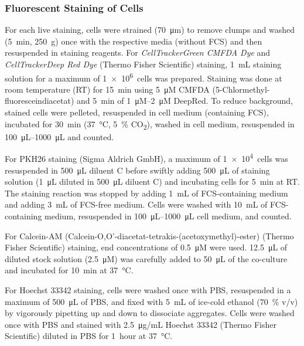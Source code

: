 \subsubsection*{Fluorescent Staining of Cells}
For each live staining, cells were strained (\SI{70}{\micro\meter}) to remove
clumps and washed (\SI{5}{\minute}, \SI{250}{g}) once with the respective media
(without FCS) and then resuspended in staining reagents. For
\textit{CellTracker\texttrademark Green CMFDA Dye} and
\textit{CellTracker\texttrademark Deep Red Dye} (Thermo Fisher Scientific)
staining, \SI{1}{mL} staining solution for a maximum of \SI{1e6}{cells} was
prepared. Staining was done at room temperature (RT) for \SI{15}{\minute} using
\SI{5}{\micro M} CMFDA (5-Chlormethyl-fluoresceindiacetat) and \SI{5}{\minute}
of \SIrange{1}{2}{\micro M} DeepRed. To reduce background, stained cells were
pelleted, resuspended in cell medium (containing FCS), incubated for
\SI{30}{\minute} (\SI{37}{\degreeCelsius}, \SI{5}{\percent}
CO\textsubscript{2}), washed in cell medium, resuspended in
\SIrange{100}{1000}{\micro\liter} and counted.

For PKH26 staining (Sigma Aldrich GmbH), a maximum of \SI{1e4}{cells} was
resuspended in \SI{500}{\micro\liter} diluent C before swiftly adding
\SI{500}{\micro\liter} of staining solution (\SI{1}{\micro\liter} diluted in
\SI{500}{\micro\liter} diluent C) and incubating cells for \SI{5}{\minute} at
RT. The staining reaction was stopped by adding \SI{1}{mL} of FCS-containing
medium and adding \SI{3}{mL} of FCS-free medium. Cells were washed with
\SI{10}{mL} of FCS-containing medium, resuspended in
\SIrange{100}{1000}{\micro\liter} cell medium, and counted.

For Calcein-AM (Calcein-O,O'-diacetat-tetrakis-(acetoxymethyl)-ester) (Thermo
Fisher Scientific) staining, end concentrations of \SI{0.5}{\micro M} were used.
\SI{12.5}{\micro\liter} of diluted stock solution (\SI{2.5}{\micro M}) was
carefully added to \SI{50}{\micro\liter} of the co-culture and incubated for
\SI{10}{\minute} at \SI{37}{\degreeCelsius}.

For Hoechst 33342 staining, cells were washed once with PBS, resuspended in a
maximum of \SI{500}{\micro\liter} of PBS, and fixed with \SI{5}{mL} of ice-cold
ethanol (\SI{70}{\percent} v/v) by vigorously pipetting up and down to
dissociate aggregates. Cells were washed once with PBS and stained with
\SI{2.5}{\micro\gram/mL} Hoechst 33342 (Thermo Fisher Scientific) diluted in PBS
for \SI{1}{hour} at \SI{37}{\degreeCelsius}.



